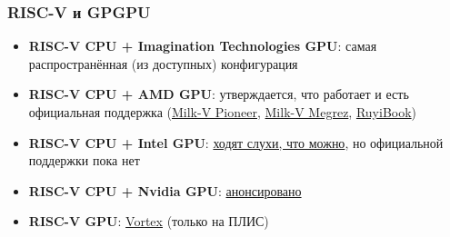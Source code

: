 \documentclass[xcolor=table,aspectratio=169]{beamer}
\begin{document}
\begin{frame}[fragile]
  \frametitle{RISC-V и GPGPU}
  \begin{itemize}
    \item \textbf{RISC-V CPU + Imagination Technologies GPU}: самая распространённая (из доступных) конфигурация
    \item \textbf{RISC-V CPU + AMD GPU}: утверждается, что работает и есть официальная поддержка (\href{https://milkv.io/pioneer}{Milk-V Pioneer}, \href{https://riscv.org/ecosystem-news/2024/10/risc-v-cpu-demoed-with-rx-7900-xtx-gpu-in-debian-linux-amd-flagship-gpu-paired-with-milk-v-megrez-board-and-sifive-p550-cores/}{Milk-V Megrez}, \href{https://milkv.io/ruyibook}{RuyiBook})
    \item \textbf{RISC-V CPU + Intel GPU}: \href{https://www.reddit.com/r/RISCV/comments/1ftep9u/intel_arc_a770_on_riscv/}{ходят слухи, что можно}, но официальной поддержки пока нет
    \item \textbf{RISC-V CPU + Nvidia GPU}: \href{https://riscv.org/ecosystem-news/2025/07/nvidia-to-bring-cuda-platform-support-to-the-risc-v/}{анонсировано}
    \item \textbf{RISC-V GPU}: \href{https://github.com/vortexgpgpu/vortex}{Vortex} (только на ПЛИС)
  \end{itemize}
\end{frame}
\end{document}
